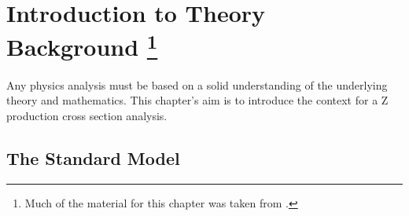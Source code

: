 \chapter[Theory of Z Boson Production]{Introduction to Theory Background \protect\footnote{Much of the material for this chapter was taken from \cite{HM}.}}
\label{theory}

Any physics analysis must be based on a 
solid understanding of the 
underlying theory and mathematics.  
This chapter's aim is to introduce 
the 
context %
for a Z production 
cross section analysis.  


\section{The Standard Model}
\label{theory:SM}




